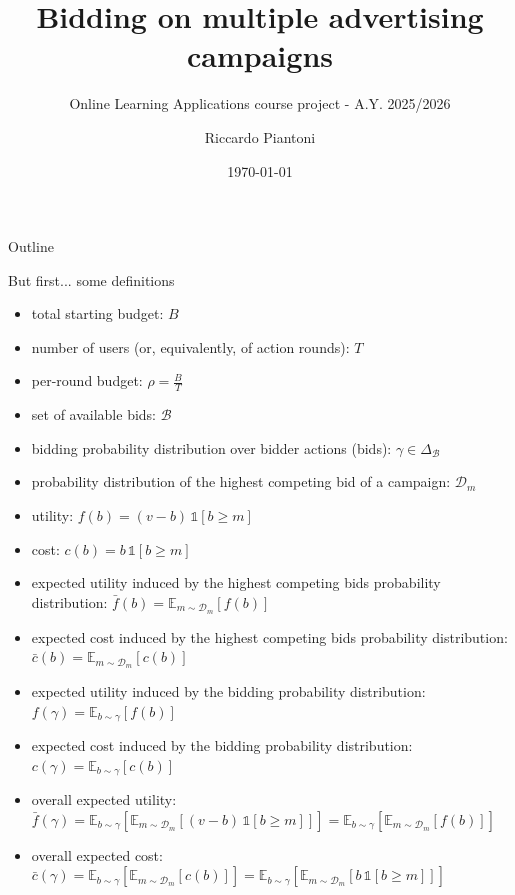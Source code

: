 \documentclass[aspectratio=169]{beamer}
\title{Bidding on multiple advertising campaigns}
\subtitle{Online Learning Applications course project - A.Y. 2025/2026}
\author{Riccardo Piantoni}
\institute{Politecnico di Milano}
\date{\today}
\begin{document}
\begin{frame}{}
    \titlepage
\end{frame}

\begin{frame}{Outline}
    \tableofcontents
\end{frame}

\begin{frame}{But first... some definitions}
    \footnotesize
    \begin{itemize}
        \item total starting budget: $B$
        \item number of users (or, equivalently, of action rounds): $T$
        \item per-round budget: $\rho = \frac{B}{T}$
        \item set of available bids: $\mathcal{B}$
        \item bidding probability distribution over bidder actions (bids): $\gamma \in \Delta_\mathcal{B}$
        \item probability distribution of the highest competing bid of a campaign: $\mathcal{D}_m$ 
        \item utility: $f(b) = (v - b)\, \mathds{1}\left[b \ge m \right]$
        \item cost: $c(b) = b\, \mathds{1}\left[b \ge m \right]$
        \item expected utility induced by the highest competing bids probability distribution: $\bar{f}(b) = \mathbb{E}_{m \sim \mathcal{D}_m}\left[f(b) \right]$
        \item expected cost induced by the highest competing bids probability distribution: $\bar{c}(b) = \mathbb{E}_{m \sim \mathcal{D}_m}\left[c(b) \right]$
        \item expected utility induced by the bidding probability distribution: $f(\gamma) = \mathbb{E}_{b \sim \gamma}\left[f(b) \right]$
        \item expected cost induced by the bidding probability distribution: $c(\gamma) = \mathbb{E}_{b \sim \gamma}\left[c(b) \right]$
        \item overall expected utility: $\bar{f}(\gamma) = \mathbb{E}_{b \sim \gamma}\left[ \mathbb{E}_{m \sim \mathcal{D}_m}\left[(v - b)\, \mathds{1}\left[b \ge m \right] \right] \right] = \mathbb{E}_{b \sim \gamma}\left[ \mathbb{E}_{m \sim \mathcal{D}_m}\left[f(b) \right] \right]$
        \item overall expected cost: $\bar{c}(\gamma) = \mathbb{E}_{b \sim \gamma}\left[ \mathbb{E}_{m \sim \mathcal{D}_m}\left[ c(b) \right] \right] = \mathbb{E}_{b \sim \gamma}\left[ \mathbb{E}_{m \sim \mathcal{D}_m}\left[ b\, \mathds{1}\left[b \ge m \right] \right] \right]$
    \end{itemize}
\end{frame}










\end{document}
